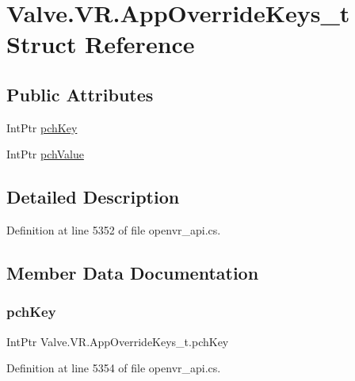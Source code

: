 \hypertarget{struct_valve_1_1_v_r_1_1_app_override_keys__t}{}\section{Valve.\+V\+R.\+App\+Override\+Keys\+\_\+t Struct Reference}
\label{struct_valve_1_1_v_r_1_1_app_override_keys__t}
\subsection*{Public Attributes}
\begin{DoxyCompactItemize}
\item 
Int\+Ptr \mbox{\hyperlink{struct_valve_1_1_v_r_1_1_app_override_keys__t_a83d357fc7ccbcc6413962e66ce3bd5ea}{pch\+Key}}
\item 
Int\+Ptr \mbox{\hyperlink{struct_valve_1_1_v_r_1_1_app_override_keys__t_aae09eb4cf94ea3f2d226bd85ecd7c106}{pch\+Value}}
\end{DoxyCompactItemize}


\subsection{Detailed Description}


Definition at line 5352 of file openvr\+\_\+api.\+cs.



\subsection{Member Data Documentation}
\mbox{\label{struct_valve_1_1_v_r_1_1_app_override_keys__t_a83d357fc7ccbcc6413962e66ce3bd5ea}} 
\subsubsection{\texorpdfstring{pchKey}{pchKey}}
{\footnotesize\ttfamily Int\+Ptr Valve.\+V\+R.\+App\+Override\+Keys\+\_\+t.\+pch\+Key}



Definition at line 5354 of file openvr\+\_\+api.\+cs.

\mbox{\label{struct_valve_1_1_v_r_1_1_app_override_keys__t_aae09eb4cf94ea3f2d226bd85ecd7c106}} 
